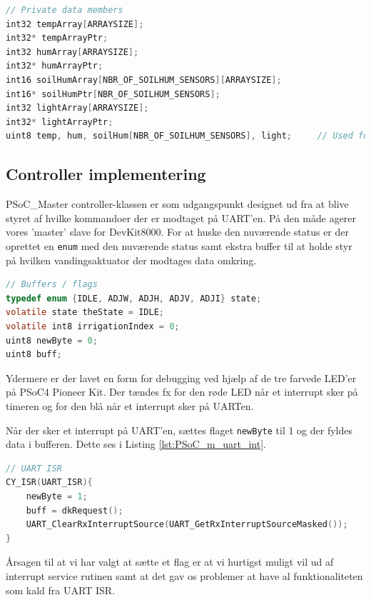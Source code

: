 \begin{lstlisting}[language=C, label=lst:DSP_decl, caption=Deklaration af arrays og pointers]
// Private data members
int32 tempArray[ARRAYSIZE];
int32* tempArrayPtr;
int32 humArray[ARRAYSIZE];
int32* humArrayPtr;
int16 soilHumArray[NBR_OF_SOILHUM_SENSORS][ARRAYSIZE];
int16* soilHumPtr[NBR_OF_SOILHUM_SENSORS];
int32 lightArray[ARRAYSIZE];
int32* lightArrayPtr;
uint8 temp, hum, soilHum[NBR_OF_SOILHUM_SENSORS], light;     // Used for storing the newest value
\end{lstlisting}



\subsection{Controller implementering}

PSoC\_Master controller-klassen er som udgangspunkt designet ud fra at blive styret af hvilke kommandoer der er modtaget på UART'en. På den måde agerer vores 'master' slave for DevKit8000. 
For at huske den nuværende status er der oprettet en \texttt{enum} med den nuværende status samt ekstra buffer til at holde styr på hvilken vandingsaktuator der modtages data omkring.

\begin{lstlisting}[language=C, label=lst:PSoC_m_dec, caption=Deklaration af buffers og flag.]
// Buffers / flags
typedef enum {IDLE, ADJW, ADJH, ADJV, ADJI} state;
volatile state theState = IDLE;
volatile int8 irrigationIndex = 0;
uint8 newByte = 0;
uint8 buff;
\end{lstlisting}

Ydermere er der lavet en form for debugging ved hjælp af de tre farvede LED'er på PSoC4 Pioneer Kit. Der tændes fx for den røde LED når et interrupt sker på timeren og for den blå når et interrupt sker på UARTen.

Når der sker et interrupt på UART'en, sættes flaget \texttt{newByte} til 1 og der fyldes data i bufferen. Dette ses i Listing \ref{lst:PSoC_m_uart_int}.

\begin{lstlisting}[language=C, label=lst:PSoC_m_uart_int, caption=ISR for UART.]
// UART ISR
CY_ISR(UART_ISR){
    newByte = 1;
    buff = dkRequest();
    UART_ClearRxInterruptSource(UART_GetRxInterruptSourceMasked());     // Clear interrupt flag
}
\end{lstlisting}

Årsagen til at vi har valgt at sætte et flag er at vi hurtigst muligt vil ud af interrupt service rutinen samt at det gav os problemer at have al funktionaliteten som kald fra UART ISR.

